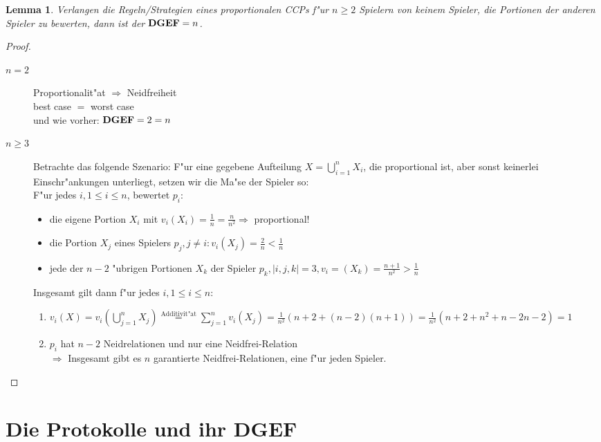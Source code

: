 \documentclass[11pt, a4paper, twoside]{article}
\newtheorem*{lem}{Lemma}
\newcommand{\DGEF}{\text{\textbf{DGEF}}}
\numberwithin{equation}{section}
\begin{document}
\begin{lem}
 Verlangen die Regeln/Strategien eines proportionalen CCPs f"ur $n\geq2$ Spielern von keinem Spieler, die Portionen der anderen Spieler
 zu bewerten, dann ist der $\DGEF=n$.
\end{lem}
\begin{proof}
 \begin{description}
  \item[$n=2$] Proportionalit"at $\Rightarrow$ Neidfreiheit\\best case $=$ worst case\\und wie vorher: $\DGEF=2=n$
  \item[$n\geq3$] Betrachte das folgende Szenario: F"ur eine gegebene Aufteilung $X=\bigcup\limits_{i=1}^nX_i$, die proportional ist, aber sonst
                  keinerlei Einschr"ankungen unterliegt, setzen wir die Ma"se der Spieler so: \\F"ur jedes $i, 1\leq i\leq n$, bewertet $p_i$:
                  \begin{itemize}
                   \item die eigene Portion $X_i$ mit $v_i(X_i)=\frac{1}{n}=\frac{n}{n^2}\Rightarrow$ proportional!
                   \item die Portion $X_j$ eines Spielers $p_j, j\neq i: v_i(X_j)=\frac{2}{n}<\frac{1}{n}$
                   \item jede der $n-2$ "ubrigen Portionen $X_k$ der Spieler $p_k, |{i,j,k}|=3, v_i=(X_k)=\frac{n+1}{n^2}>\frac{1}{n}$
                  \end{itemize}
                  Insgesamt gilt dann f"ur jedes $i, 1\leq i\leq n$:
                  \begin{enumerate}
                   \item $v_i(X)=v_i(\bigcup\limits_{j=1}^nX_j)\stackrel{\text{Additivit"at}}{=}\sum\limits_{j=1}^nv_i(X_j)=
                         \frac{1}{n^2}(n+2+(n-2)(n+1))=\frac{1}{n^2}(n+2+n^2+n-2n-2)=1$
                   \item $p_i$ hat $n-2$ Neidrelationen und nur eine Neidfrei-Relation\\$\Rightarrow$ Insgesamt gibt es $n$ garantierte 
                         Neidfrei-Relationen, eine f"ur jeden Spieler.
                  \end{enumerate}
 \end{description}
\end{proof}
\section{Die Protokolle und ihr DGEF}
\end{document}
